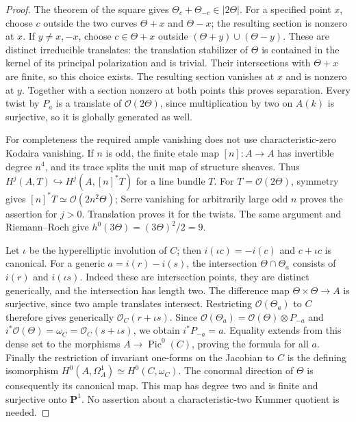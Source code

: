 \begin{proof}
The theorem of the square gives
$\Theta_c+\Theta_{-c}\in|2\Theta|$.
For a specified point $x$, choose $c$ outside the two curves
$\Theta+x$ and $\Theta-x$; the resulting section is nonzero at $x$.
If $y\ne x,-x$, choose $c\in\Theta+x$ outside
$(\Theta+y)\cup(\Theta-y)$. These are distinct irreducible translates:
the translation stabilizer of $\Theta$ is contained in the kernel of
its principal polarization and is trivial. Their intersections with
$\Theta+x$ are finite, so this choice exists. The resulting section
vanishes at $x$ and is nonzero at $y$. Together with a section nonzero
at both points this proves separation. Every twist by $P_a$ is a
translate of $\mathcal O(2\Theta)$, since multiplication by two on
$A(k)$ is surjective, so it is globally generated as well.

For completeness the required ample vanishing does not use
characteristic-zero Kodaira vanishing. If $n$ is odd, the finite etale
map $[n]:A\to A$ has invertible degree $n^4$, and its trace splits the
unit map of structure sheaves. Thus
$H^j(A,T)\hookrightarrow H^j(A,[n]^*T)$ for a line bundle $T$.
For $T=\mathcal O(2\Theta)$, symmetry gives
$[n]^*T\simeq\mathcal O(2n^2\Theta)$; Serre vanishing for arbitrarily
large odd $n$ proves the assertion for $j>0$. Translation proves it
for the twists. The same argument and Riemann--Roch give
$h^0(3\Theta)=(3\Theta)^2/2=9$.

Let $\iota$ be the hyperelliptic involution of $C$; then
$i(\iota c)=-i(c)$ and $c+\iota c$ is canonical. For a generic
$a=i(r)-i(s)$, the intersection $\Theta\cap\Theta_a$ consists of
$i(r)$ and $i(\iota s)$. Indeed these are intersection points, they
are distinct generically, and the intersection has length two.
The difference map $\Theta\times\Theta\to A$ is surjective, since
two ample translates intersect. Restricting $\mathcal O(\Theta_a)$
to $C$ therefore gives generically
$\mathcal O_C(r+\iota s)$. Since
$\mathcal O(\Theta_a)=\mathcal O(\Theta)\otimes P_{-a}$ and
$i^*\mathcal O(\Theta)=\omega_C=\mathcal O_C(s+\iota s)$,
we obtain $i^*P_{-a}=a$. Equality extends from this dense set to the
morphisms $A\to\operatorname{Pic}^0(C)$, proving the formula for all $a$.
Finally the restriction of invariant one-forms on the Jacobian to
$C$ is the defining isomorphism
$H^0(A,\Omega_A^1)\simeq H^0(C,\omega_C)$.
The conormal direction of $\Theta$ is consequently its canonical
map. This map has degree two and is finite and surjective onto
$\mathbf P^1$. No assertion about a characteristic-two Kummer
quotient is needed.
\end{proof}

